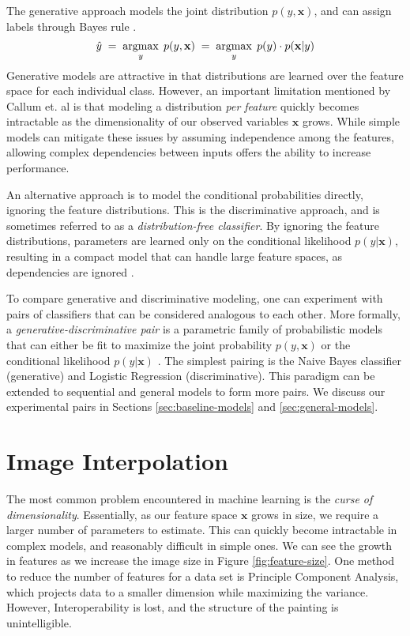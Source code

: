 \documentclass{article}
\DeclareMathOperator*{\argmax}{argmax}
\begin{document}
The generative approach models the joint distribution $p(y, \mathbf{x})$,
and can assign labels through Bayes rule \cite{NgJordan}.
\begin{equation}
    \hat{y} \; = \; \argmax_y \; p(y, \mathbf{x}) \; = \; \argmax_y \; p(y) \cdot p(\mathbf{x} | y) \\
\end{equation}
Generative models are attractive in that distributions are learned over the
feature space for each individual class. However, an important limitation
mentioned by Callum et. al \cite{McCallumCRF} is that modeling a distribution
\textit{per feature} quickly becomes intractable as the dimensionality of our
observed variables $\mathbf{x}$ grows. While simple models can mitigate
these issues by assuming independence among the features, allowing complex
dependencies between inputs offers the ability to increase performance.

An alternative approach is to model the conditional probabilities directly,
ignoring the feature distributions. This is the discriminative approach,
and is sometimes referred to as a \textit{distribution-free classifier}.
By ignoring the feature distributions, parameters are learned only on the
conditional likelihood $p(y | \mathbf{x})$, resulting in a compact model
that can handle large feature spaces, as dependencies
are ignored \cite{McCallumCRF}.

To compare generative and discriminative modeling, one can experiment
with pairs of classifiers that can be considered analogous to each other.
More formally, a \textit{generative-discriminative pair} is a parametric
family of probabilistic models that can either be fit to maximize the joint
probability $p(y, \mathbf{x})$ or the conditional
likelihood $p(y | \mathbf{x})$ \cite{NgJordan}. The simplest pairing is
the Naive Bayes classifier (generative) and Logistic Regression
(discriminative). This paradigm can be extended to sequential and general
models to form more pairs. We discuss our experimental pairs
in Sections \ref{sec:baseline-models} and \ref{sec:general-models}.




\section{Image Interpolation}
\label{sec:img-interpolation}
The most common problem encountered in machine learning is the
\textit{curse of dimensionality}. Essentially, as our feature space
$\mathbf{x}$ grows in size, we require a larger number of parameters to
estimate. This can quickly become intractable in complex models, and
reasonably difficult in simple ones. We can see the growth
in features as we increase the image size in Figure \ref{fig:feature-size}.
One method to reduce the number of
features for a data set is Principle Component Analysis, which projects
data to a smaller dimension while maximizing the variance. However,
Interoperability is lost, and the structure of the painting is unintelligible.
\end{document}
